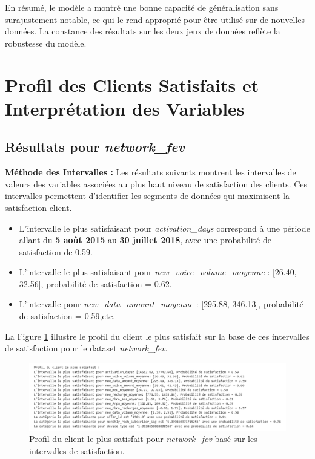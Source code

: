 En résumé, le modèle a montré une bonne capacité de généralisation sans surajustement notable, ce qui le rend approprié pour être utilisé sur de nouvelles données. La constance des résultats sur les deux jeux de données reflète la robustesse du modèle.

\section{Profil des Clients Satisfaits et Interprétation des Variables}
\subsection{Résultats pour \textit{network\_fev}}

\textbf{Méthode des Intervalles :}
Les résultats suivants montrent les intervalles de valeurs des variables associées au plus haut niveau de satisfaction des clients. Ces intervalles permettent d'identifier les segments de données qui maximisent la satisfaction client.

\begin{itemize}
    \item L'intervalle le plus satisfaisant pour \textit{activation\_days} correspond à une période allant du \textbf{5 août 2015} au \textbf{30 juillet 2018}, avec une probabilité de satisfaction de 0.59.
    \item L'intervalle le plus satisfaisant pour \textit{new\_voice\_volume\_moyenne} : [26.40, 32.56], probabilité de satisfaction = 0.62.
    \item L'intervalle pour \textit{new\_data\_amount\_moyenne} : [295.88, 346.13], probabilité de satisfaction = 0.59,etc.
\end{itemize}

La Figure \ref{fig:profil_satisfaction} illustre le profil du client le plus satisfait sur la base de ces intervalles de satisfaction pour le dataset \textit{network\_fev}.

\begin{figure}[H]
    \centering
    \includegraphics[width=0.9\linewidth]{capture_modele_32.png}
    \caption{Profil du client le plus satisfait pour \textit{network\_fev} basé sur les intervalles de satisfaction.}
    \label{fig:profil_satisfaction}
\end{figure}

